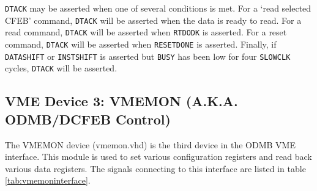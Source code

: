 \documentclass[10pt,a4paper]{article}
\begin{document}
\texttt{DTACK} may be asserted when one of several conditions is met. For a `read selected CFEB' command, \texttt{DTACK} will be asserted when the data is ready to read. For a read command, \texttt{DTACK} will be asserted when \texttt{RTDODK} is asserted. For a reset command, \texttt{DTACK} will be asserted when \texttt{RESETDONE} is asserted. Finally, if \texttt{DATASHIFT} or \texttt{INSTSHIFT} is asserted but \texttt{BUSY} has been low for four \texttt{SLOWCLK} cycles, \texttt{DTACK} will be asserted.

\subsection{VME Device 3: VMEMON (A.K.A. ODMB/DCFEB Control)}

The VMEMON device (vmemon.vhd) is the third device in the ODMB VME interface. This module is used to set various configuration registers and read back various data registers. The signals connecting to this interface are listed in table \ref{tab:vmemoninterface}. %
\end{document}
